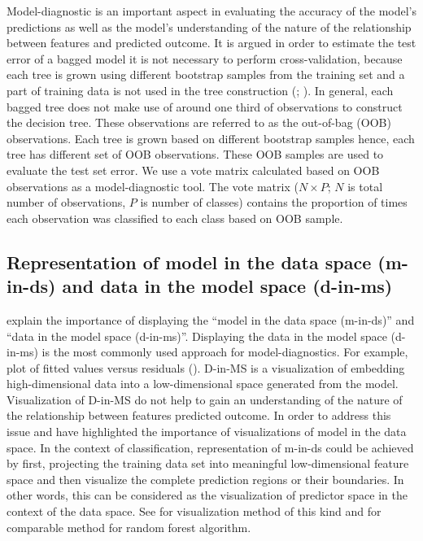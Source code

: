 \documentclass[11pt,a4paper,]{article}
\begin{document}
Model-diagnostic is an important aspect in evaluating the accuracy of
the model's predictions as well as the model's understanding of the
nature of the relationship between features and predicted outcome. It is
argued in order to estimate the test error of a bagged model it is not
necessary to perform cross-validation, because each tree is grown using
different bootstrap samples from the training set and a part of training
data is not used in the tree construction (\textcite{breiman2001random};
\textcite{chen2004using}). In general, each bagged tree does not make
use of around one third of observations to construct the decision tree.
These observations are referred to as the out-of-bag (OOB) observations.
Each tree is grown based on different bootstrap samples hence, each tree
has different set of OOB observations. These OOB samples are used to
evaluate the test set error. We use a vote matrix calculated based on
OOB observations as a model-diagnostic tool. The vote matrix
(\(N \times P\); \(N\) is total number of observations, \(P\) is number
of classes) contains the proportion of times each observation was
classified to each class based on OOB sample.

\subsection{Representation of model in the data space (m-in-ds) and data
in the model space
(d-in-ms)}\label{representation-of-model-in-the-data-space-m-in-ds-and-data-in-the-model-space-d-in-ms}

\textcite{wickham2015visualizing} explain the importance of displaying
the ``model in the data space (m-in-ds)'' and ``data in the model space
(d-in-ms)''. Displaying the data in the model space (d-in-ms) is the
most commonly used approach for model-diagnostics. For example, plot of
fitted values versus residuals (\textcite{wickham2015visualizing}).
D-in-MS is a visualization of embedding high-dimensional data into a
low-dimensional space generated from the model. Visualization of D-in-MS
do not help to gain an understanding of the nature of the relationship
between features predicted outcome. In order to address this issue
\textcite{wickham2015visualizing} and \textcite{da2017interactive} have
highlighted the importance of visualizations of model in the data space.
In the context of classification, representation of m-in-ds could be
achieved by first, projecting the training data set into meaningful
low-dimensional feature space and then visualize the complete prediction
regions or their boundaries. In other words, this can be considered as
the visualization of predictor space in the context of the data space.
See \textcite{wickham2015visualizing} for visualization method of this
kind and \textcite{da2017interactive} for comparable method for random
forest algorithm.
\end{document}

